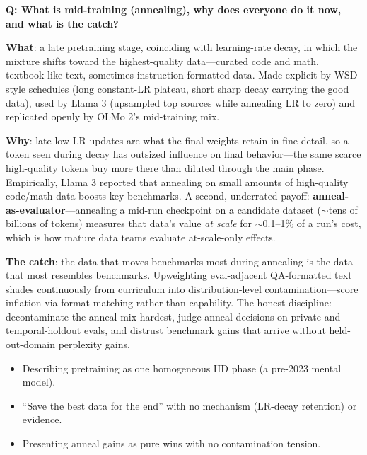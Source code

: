 \begin{interviewq}
\textbf{Q: What is mid-training (annealing), why does everyone do it now, and what is the catch?}

 \quad {} \quad \badgefreq{\freqmed}

\stronganswer
\textbf{What}: a late pretraining stage, coinciding with learning-rate decay, in which the mixture shifts toward the highest-quality data---curated code and math, textbook-like text, sometimes instruction-formatted data. Made explicit by WSD-style schedules (long constant-LR plateau, short sharp decay carrying the good data), used by Llama 3 (upsampled top sources while annealing LR to zero) and replicated openly by OLMo 2's mid-training mix.

\textbf{Why}: late low-LR updates are what the final weights retain in fine detail, so a token seen during decay has outsized influence on final behavior---the same scarce high-quality tokens buy more there than diluted through the main phase. Empirically, Llama 3 reported that annealing on small amounts of high-quality code/math data boosts key benchmarks. A second, underrated payoff: \textbf{anneal-as-evaluator}---annealing a mid-run checkpoint on a candidate dataset ($\sim$tens of billions of tokens) measures that data's value \textit{at scale} for $\sim$0.1--1\% of a run's cost, which is how mature data teams evaluate at-scale-only effects.

\textbf{The catch}: the data that moves benchmarks most during annealing is the data that most resembles benchmarks. Upweighting eval-adjacent QA-formatted text shades continuously from curriculum into distribution-level contamination---score inflation via format matching rather than capability. The honest discipline: decontaminate the anneal mix hardest, judge anneal decisions on private and temporal-holdout evals, and distrust benchmark gains that arrive without held-out-domain perplexity gains.

\redflags
\begin{itemize}
    \item Describing pretraining as one homogeneous IID phase (a pre-2023 mental model).
    \item ``Save the best data for the end'' with no mechanism (LR-decay retention) or evidence.
    \item Presenting anneal gains as pure wins with no contamination tension.
\end{itemize}



\end{interviewq}
